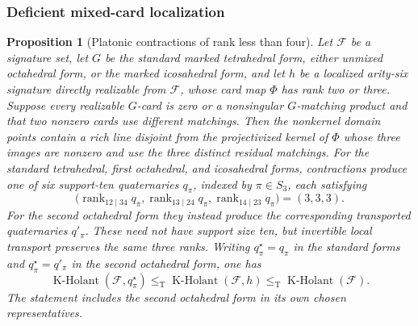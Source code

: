 \documentclass[11pt,letterpaper,onecolumn]{article}
\theoremstyle{plain}
\newtheorem{proposition}[proposition]{Proposition}
\theoremstyle{definition}
\theoremstyle{remark}
\newcommand{\cF}{\mathcal F}
\newcommand{\KHolant}{\operatorname{K\text{-}Holant}}
\newcommand{\rank}{\operatorname{rank}}
\newcommand{\leT}{\leq_{\mathrm T}}
\begin{document}
\subsubsection{Deficient mixed-card localization}
\label{proofsubsec:cert-platonic-deficient-mixed}

\begin{proposition}[Platonic contractions of rank less than four]
\label{prop:cert-platonic-deficient-mixed}
Let \(\cF\) be a signature set, let \(G\) be the standard marked
tetrahedral form, either unmixed octahedral form, or the marked icosahedral
form, and let \(h\) be a localized arity-six signature directly realizable from
\(\cF\), whose
card map \(\Phi\) has rank two or three.  Suppose every realizable
\(G\)-card is zero or a nonsingular \(G\)-matching product and that two nonzero
cards use different matchings.  Then the nonkernel domain points contain a
rich line disjoint from the projectivized kernel of \(\Phi\) whose three
images are nonzero and use the three distinct residual matchings.  For the
standard tetrahedral, first
octahedral, and icosahedral forms, contractions produce one of six
support-ten quaternaries \(q_\pi\), indexed by \(\pi\in S_3\), each
satisfying
\begin{equation}
  \bigl(\rank_{12\mid34}q_\pi,
        \rank_{13\mid24}q_\pi,
        \rank_{14\mid23}q_\pi\bigr)=(3,3,3).
  \label{eq:platonic-rank-two-q4-minors}
\end{equation}
For the second octahedral form they instead produce the corresponding
transported quaternaries \(q'_\pi\).  These need not have support size ten,
but invertible local transport preserves the same three ranks.  Writing
\(q^\star_\pi=q_\pi\) in the standard forms and
\(q^\star_\pi=q'_\pi\) in the second octahedral form, one has
\[
  \KHolant(\cF,q^\star_\pi)
  \leT\KHolant(\cF,h)
  \leT\KHolant(\cF).
\]
The statement includes the second octahedral form in its own chosen representatives.
\end{proposition}
\end{document}
